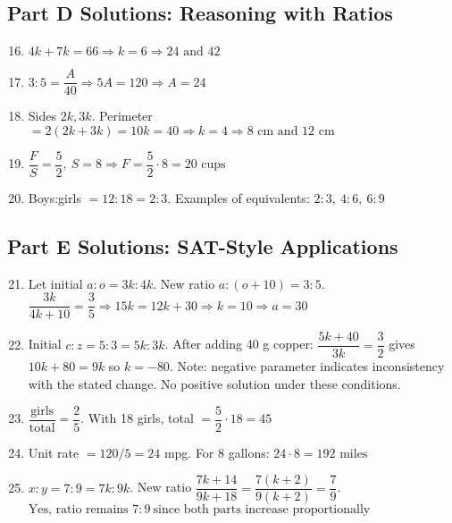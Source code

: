 \documentclass[12pt]{article}
\begin{document}
\subsection*{Part D Solutions: Reasoning with Ratios}
\begin{enumerate}
  \setcounter{enumi}{15}
  \item \(4k+7k=66 \Rightarrow k=6 \Rightarrow \boxed{24\text{ and }42}\)
  \item \(3:5=\dfrac{A}{40} \Rightarrow 5A=120 \Rightarrow \boxed{A=24}\)
  \item Sides \(2k,3k\). Perimeter \(=2(2k+3k)=10k=40 \Rightarrow k=4 \Rightarrow \boxed{8\text{ cm and }12\text{ cm}}\)
  \item \(\dfrac{F}{S}=\dfrac{5}{2},\ S=8 \Rightarrow F=\dfrac{5}{2}\cdot8=\boxed{20\text{ cups}}\)
  \item Boys:girls \(=12:18=2:3\). Examples of equivalents: \(\boxed{2:3,\ 4:6,\ 6:9}\)
\end{enumerate}

\subsection*{Part E Solutions: SAT-Style Applications}
\begin{enumerate}
  \setcounter{enumi}{20}
  \item Let initial \(a:o=3k:4k\). New ratio \(a:(o+10)=3:5\).  
  \( \dfrac{3k}{4k+10}=\dfrac{3}{5} \Rightarrow 15k=12k+30 \Rightarrow k=10 \Rightarrow \boxed{a=30}\)
  \item Initial \(c:z=5:3=5k:3k\). After adding 40 g copper: \(\dfrac{5k+40}{3k}=\dfrac{3}{2}\) gives \(10k+80=9k\) so \(k=-80\).  
  Note: negative parameter indicates inconsistency with the stated change. No positive solution under these conditions.
  \item \(\dfrac{\text{girls}}{\text{total}}=\dfrac{2}{5}\). With 18 girls, total \(=\dfrac{5}{2}\cdot18=\boxed{45}\)
  \item Unit rate \(=120/5=24\) mpg. For 8 gallons: \(24\cdot8=\boxed{192\text{ miles}}\)
  \item \(x:y=7:9=7k:9k\). New ratio \(\dfrac{7k+14}{9k+18}=\dfrac{7(k+2)}{9(k+2)}=\dfrac{7}{9}\).  \newline
  \(\boxed{\text{Yes, ratio remains }7:9\ \text{since both parts increase proportionally}}\)
\end{enumerate}
\end{document}
